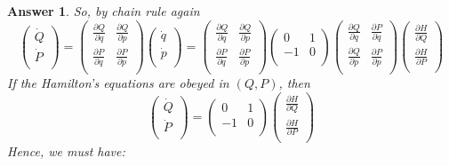 \documentclass[a4paper]{article}
\newtheorem{ans}{Answer}[section]
\theoremstyle{new}
\begin{document}
\begin{ans}
So, by chain rule again
$$\begin{pmatrix}\dot{Q}\\\dot{P}\\\end{pmatrix}=\begin{pmatrix}\frac{\partial Q}{\partial q}&\frac{\partial Q}{\partial p}\\\frac{\partial P}{\partial q}&\frac{\partial P}{\partial p}\\\end{pmatrix}\begin{pmatrix}\dot{q}\\\dot{p}\\\end{pmatrix}=\begin{pmatrix}\frac{\partial Q}{\partial q}&\frac{\partial Q}{\partial p}\\\frac{\partial P}{\partial q}&\frac{\partial P}{\partial p}\\\end{pmatrix}\begin{pmatrix}0&1\\-1&0\\\end{pmatrix}\begin{pmatrix}\frac{\partial Q}{\partial q}&\frac{\partial P}{\partial q}\\\frac{\partial Q}{\partial p}&\frac{\partial P}{\partial p}\\\end{pmatrix}\begin{pmatrix}\frac{\partial H}{\partial Q}\\\frac{\partial H}{\partial P}\\\end{pmatrix}$$
If the Hamilton's equations are obeyed in $(Q,P)$, then 
$$\begin{pmatrix}\dot{Q}\\\dot{P}\\\end{pmatrix}=\begin{pmatrix}0&1\\-1&0\\\end{pmatrix}\begin{pmatrix}\frac{\partial H}{\partial Q}\\\frac{\partial H}{\partial P}\\\end{pmatrix}$$
Hence, we must have:

\end{ans}
\end{document}
